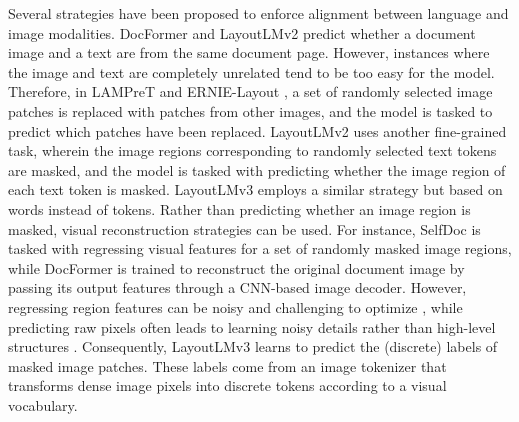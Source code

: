 Several strategies have been proposed to enforce alignment between language and image modalities. DocFormer \citep{appalaraju2021docformer} and LayoutLMv2 \citep{xu2020layoutlmv2} predict whether a document image and a text are from the same document page. However, instances where the image and text are completely unrelated tend to be too easy for the model. Therefore, in \ac{LAMPreT} \citep{wu2021lampret} and ERNIE-Layout \citep{peng2022ernie}, a set of randomly selected image patches is replaced with patches from other images, and the model is tasked to predict which patches have been replaced. LayoutLMv2 uses another fine-grained task, wherein the image regions corresponding to randomly selected text tokens are masked, and the model is tasked with predicting whether the image region of each text token is masked. LayoutLMv3 \citep{huang2022layoutlmv3} employs a similar strategy but based on words instead of tokens. Rather than predicting whether an image region is masked, visual reconstruction strategies can be used. For instance, SelfDoc \citep{li2021selfdoc} is tasked with regressing visual features for a set of randomly masked image regions, while DocFormer \citep{appalaraju2021docformer} is trained to reconstruct the original document image by passing its output features through a \ac{CNN}-based image decoder. However, regressing region features can be noisy and challenging to optimize \citep{cho2020x}, while predicting raw pixels often leads to learning noisy details rather than high-level structures \citep{ramesh2021zero}. Consequently, LayoutLMv3 learns to predict the (discrete) labels of masked image patches. These labels come from an image tokenizer that transforms dense image pixels into discrete tokens according to a visual vocabulary.


